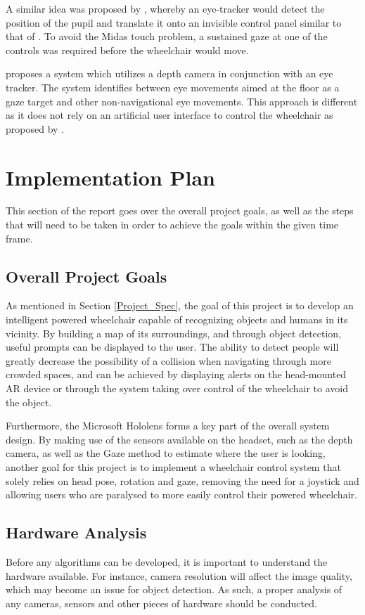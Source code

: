 \documentclass[12pt,a4paper]{report}
\begin{document}
A similar idea was proposed by \cite{Arai2011}, whereby an eye-tracker would detect the position of the pupil and translate it onto an invisible control panel similar to that of \cite{Wastlund2010}. To avoid the Midas touch problem, a sustained gaze at one of the controls was required before the wheelchair would move.

\cite{Raymond2018} proposes a system which utilizes a depth camera in conjunction with an eye tracker. The system identifies between eye movements aimed at the floor as a gaze target and other non-navigational eye movements. This approach is different as it does not rely on an artificial user interface to control the wheelchair as proposed by \cite{Arai2011, Wastlund2010}.


\newpage
\chapter{Implementation Plan}
This section of the report goes over the overall project goals, as well as the steps that will need to be taken in order to achieve the goals within the given time frame.

\section{Overall Project Goals}
As mentioned in Section \ref{Project_Spec}, the goal of this project is to develop an intelligent powered wheelchair capable of recognizing objects and humans in its vicinity. By building a map of its surroundings, and through object detection, useful prompts can be displayed to the user. The ability to detect people will greatly decrease the possibility of a collision when navigating through more crowded spaces, and can be achieved by displaying alerts on the head-mounted AR device or through the system taking over control of the wheelchair to avoid the object.

Furthermore, the Microsoft Hololens forms a key part of the overall system design. By making use of the sensors available on the headset, such as the depth camera, as well as the Gaze method to estimate where the user is looking, another goal for this project is to implement a wheelchair control system that solely relies on head pose, rotation and gaze, removing the need for a joystick and allowing users who are paralysed to more easily control their powered wheelchair.

\section{Hardware Analysis}
Before any algorithms can be developed, it is important to understand the hardware available. For instance, camera resolution will affect the image quality, which may become an issue for object detection. As such, a proper analysis of any cameras, sensors and other pieces of hardware should be conducted.
\end{document}
